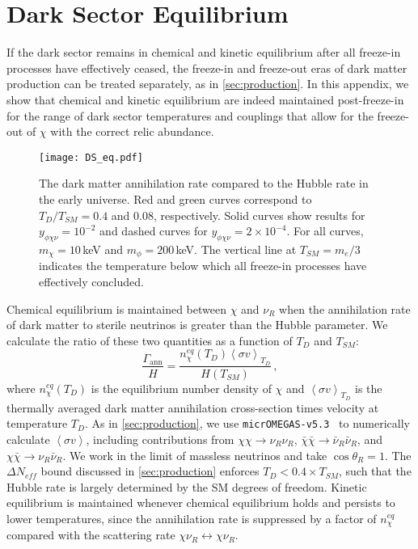 \documentclass[aps, prd, reprint, nofootinbib, amsmath, amssymb, floatfix]{revtex4-2}
\begin{document}

\section{\label{app:dark_EQ} Dark Sector Equilibrium}

If the dark sector remains in chemical and kinetic equilibrium after all freeze-in processes have effectively ceased, the freeze-in and freeze-out eras of dark matter production can be treated separately, as in \cref{sec:production}. In this appendix, we show that chemical and kinetic equilibrium are indeed maintained post-freeze-in for the range of dark sector temperatures and couplings that allow for the freeze-out of $\chi$ with the correct relic abundance.

\begin{figure}
    \texttt{[image: DS\_eq.pdf]}
    \caption{\label{fig:DS_eq} The dark matter annihilation rate compared to the Hubble rate in the early universe. Red and green curves correspond to $T_D/T_{SM} = 0.4$ and $0.08$, respectively. Solid curves show results for $y_{\phi\chi\nu} = 10^{-2}$ and dashed curves for $y_{\phi\chi\nu} = 2\times 10^{-4}$. For all curves, $m_\chi = 10$\,keV and $m_\phi = 200$\,keV. The vertical line at $T_{SM} = m_e/3$ indicates the temperature below which all freeze-in processes have effectively concluded.}
\end{figure}

Chemical equilibrium is maintained between $\chi$ and $\nu_R$ when the annihilation rate of dark matter to sterile neutrinos is greater than the Hubble parameter. We calculate the ratio of these two quantities as a function of $T_D$ and $T_{SM}$:
%
\begin{equation}\label{eq:DS_rate}
    \frac{\Gamma_{\mathrm{ann}}}{H} = \frac{n_\chi^{eq}(T_D) \left<\sigma v \right>_{T_D}}{H(T_{SM})} \,,
\end{equation}
%
where $n_\chi^{eq}(T_D)$ is the equilibrium number density of $\chi$ and $\left<\sigma v\right>_{T_D}$ is the thermally averaged dark matter annihilation cross-section times velocity at temperature $T_D$. As in \cref{sec:production}, we use \texttt{micrOMEGAS-v5.3}~\cite{Alguero:2022inz} to numerically calculate $\left<\sigma v\right>$, including contributions from $\chi\chi\to\nu_R\nu_R$, $\bar{\chi}\bar{\chi}\to\bar{\nu}_R\bar{\nu}_R$, and $\chi\bar{\chi}\to\nu_R\bar{\nu}_R $. We work in the limit of massless neutrinos and take $\cos\theta_R = 1$. The $\Delta N_{eff}$ bound discussed in \cref{sec:production} enforces $T_D < 0.4 \times T_{SM}$, such that the Hubble rate is largely determined by the SM degrees of freedom. Kinetic equilibrium is maintained whenever chemical equilibrium holds and persists to lower temperatures, since the annihilation rate is suppressed by a factor of $n_\chi^{eq}$ compared with the scattering rate $\chi\nu_R\leftrightarrow\chi\nu_R$.
\end{document}
